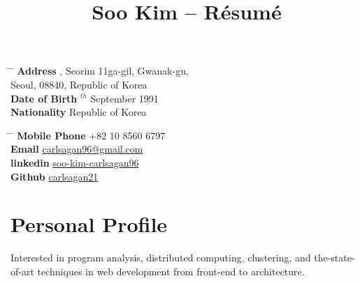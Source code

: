 \documentclass[10pt]{article} %
\begin{document}

\title{Soo Kim -- Résumé} %


\parbox{0.5\textwidth}{ %
\begin{tabbing} %
\hspace{3cm} \= \hspace{4cm} \= \kill %
{\bf Address} , Seorim 11ga-gil, Gwanak-gu,\\ %
\> Seoul, 08840, Republic of Korea \\ %
{\bf Date of Birth} $^{th}$ September 1991 \\ %
{\bf Nationality} \> Republic of Korea %
\end{tabbing}
}
\hfill %
\parbox{0.5\textwidth}{ %
\begin{tabbing} %
\hspace{3cm} \= \hspace{4cm} \= \kill %
{\bf Mobile Phone} \> +82 10 8560 6797 \\ %
{\bf Email} \> \href{mailto:carlsagan96@gmail.com}{carlsagan96@gmail.com} \\ %
{\bf linkedin} \> \href{https://www.linkedin.com/in/soo-kim-carlsagan96/}{soo-kim-carlsagan96} \\
{\bf Github} \> \href{https://github.com/carlsagan21}{carlsagan21}
\end{tabbing}}


\section{Personal Profile}

Interested in program analysis, distributed computing, clustering, and the-state-of-art techniques in web development from front-end to architecture.
\end{document}
